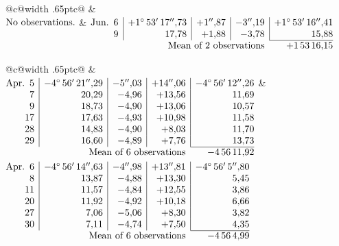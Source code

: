 \noindent\begin{tabular}{@{}c@{\hspace{.4em}\vrule width .65pt\hspace{.4em}}c@{}}
 &
 \\[.18ex]
\(\begin{array}[t]{@{}l@{}}\text{No observations.}\end{array}\)
&
\(\begin{array}[t]{@{}r|r|r|r|r@{}}
\text{Jun.}\enspace 6 & +1^\circ\,53'\,17''{,}73 & +1''{,}87 & -3''{,}19 & +1^\circ\,53'\,16''{,}41\\
9 & 17{,}78 & +1{,}88 & -3{,}78 & 15{,}88\\
\cline{5-5}
\multicolumn{4}{r}{\text{Mean of 2 observations}} & +1\,53\,16{,}15
\end{array}\)
\end{tabular}\par\medskip
{}
\noindent\begin{tabular}{@{}c@{\hspace{.4em}\vrule width .65pt\hspace{.4em}}c@{}}
 &
 \\[.18ex]
\(\begin{array}[t]{@{}r|r|r|r|r@{}}
\text{Apr.}\enspace 5 & -4^\circ\,56'\,21''{,}29 & -5''{,}03 & +14''{,}06 & -4^\circ\,56'\,12''{,}26\\
7 & 20{,}29 & -4{,}96 & +13{,}56 & 11{,}69\\
9 & 18{,}73 & -4{,}90 & +13{,}06 & 10{,}57\\
17 & 17{,}63 & -4{,}93 & +10{,}98 & 11{,}58\\
28 & 14{,}83 & -4{,}90 & +8{,}03 & 11{,}70\\
29 & 16{,}60 & -4{,}89 & +7{,}76 & 13{,}73\\
\cline{5-5}
\multicolumn{4}{r}{\text{Mean of 6 observations}} & -4\,56\,11{,}92
\end{array}\)
&
\(\begin{array}[t]{@{}r|r|r|r|r@{}}
\text{Apr.}\enspace 6 & -4^\circ\,56'\,14''{,}63 & -4''{,}98 & +13''{,}81 & -4^\circ\,56'\,5''{,}80\\
8 & 13{,}87 & -4{,}88 & +13{,}30 & 5{,}45\\
11 & 11{,}57 & -4{,}84 & +12{,}55 & 3{,}86\\
20 & 11{,}92 & -4{,}92 & +10{,}18 & 6{,}66\\
27 & 7{,}06 & -5{,}06 & +8{,}30 & 3{,}82\\
30 & 7{,}11 & -4{,}74 & +7{,}50 & 4{,}35\\
\cline{5-5}
\multicolumn{4}{r}{\text{Mean of 6 observations}} & -4\,56\,4{,}99
\end{array}\)
\end{tabular}\par\medskip
